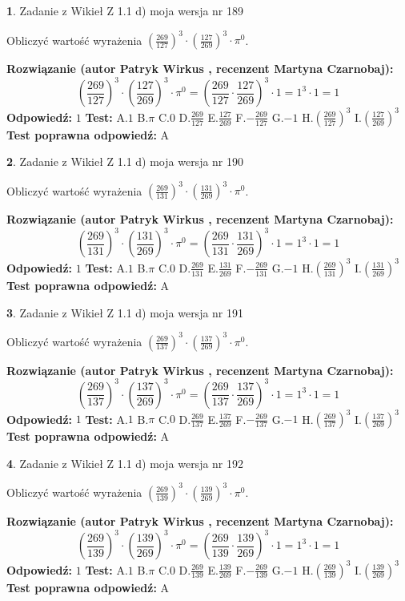 \documentclass[12pt, a4paper]{article}
\theoremstyle{definition} %
\newtheorem{zad}{}
\newcommand{\zadStart}[1]{\begin{zad}#1\newline}
\newcommand{\zadStop}{\end{zad}}
\newcommand{\rozwStart}[2]{\noindent \textbf{Rozwiązanie (autor #1 , recenzent #2): }\newline}
\newcommand{\rozwStop}{\newline}
\newcommand{\odpStart}{\noindent \textbf{Odpowiedź:}\newline}
\newcommand{\odpStop}{\newline}
\newcommand{\testStart}{\noindent \textbf{Test:}\newline}
\newcommand{\testStop}{\newline}
\newcommand{\kluczStart}{\noindent \textbf{Test poprawna odpowiedź:}\newline}
\newcommand{\kluczStop}{\newline}
\begin{document}
\zadStart{Zadanie z Wikieł Z 1.1 d) moja wersja nr 189}

Obliczyć wartość wyrażenia $(\frac{269}{127})^{3} \cdot (\frac{127}{269})^{3} \cdot \pi^{0}$.
\zadStop
\rozwStart{Patryk Wirkus}{Martyna Czarnobaj}
$$(\frac{269}{127})^{3} \cdot (\frac{127}{269})^{3} \cdot \pi^{0} = (\frac{269}{127} \cdot \frac{127}{269})^{3} \cdot 1 = 1^{3} \cdot 1 = 1$$
\rozwStop
\odpStart
$1$
\odpStop
\testStart
A.$1$ B.$\pi$ C.$0$ D.$\frac{269}{127}$ E.$\frac{127}{269}$
F.$-\frac{269}{127}$ G.$-1$
H.$(\frac{269}{127})^{3}$
I.$(\frac{127}{269})^{3}$
\testStop
\kluczStart
A
\kluczStop



\zadStart{Zadanie z Wikieł Z 1.1 d) moja wersja nr 190}

Obliczyć wartość wyrażenia $(\frac{269}{131})^{3} \cdot (\frac{131}{269})^{3} \cdot \pi^{0}$.
\zadStop
\rozwStart{Patryk Wirkus}{Martyna Czarnobaj}
$$(\frac{269}{131})^{3} \cdot (\frac{131}{269})^{3} \cdot \pi^{0} = (\frac{269}{131} \cdot \frac{131}{269})^{3} \cdot 1 = 1^{3} \cdot 1 = 1$$
\rozwStop
\odpStart
$1$
\odpStop
\testStart
A.$1$ B.$\pi$ C.$0$ D.$\frac{269}{131}$ E.$\frac{131}{269}$
F.$-\frac{269}{131}$ G.$-1$
H.$(\frac{269}{131})^{3}$
I.$(\frac{131}{269})^{3}$
\testStop
\kluczStart
A
\kluczStop



\zadStart{Zadanie z Wikieł Z 1.1 d) moja wersja nr 191}

Obliczyć wartość wyrażenia $(\frac{269}{137})^{3} \cdot (\frac{137}{269})^{3} \cdot \pi^{0}$.
\zadStop
\rozwStart{Patryk Wirkus}{Martyna Czarnobaj}
$$(\frac{269}{137})^{3} \cdot (\frac{137}{269})^{3} \cdot \pi^{0} = (\frac{269}{137} \cdot \frac{137}{269})^{3} \cdot 1 = 1^{3} \cdot 1 = 1$$
\rozwStop
\odpStart
$1$
\odpStop
\testStart
A.$1$ B.$\pi$ C.$0$ D.$\frac{269}{137}$ E.$\frac{137}{269}$
F.$-\frac{269}{137}$ G.$-1$
H.$(\frac{269}{137})^{3}$
I.$(\frac{137}{269})^{3}$
\testStop
\kluczStart
A
\kluczStop



\zadStart{Zadanie z Wikieł Z 1.1 d) moja wersja nr 192}

Obliczyć wartość wyrażenia $(\frac{269}{139})^{3} \cdot (\frac{139}{269})^{3} \cdot \pi^{0}$.
\zadStop
\rozwStart{Patryk Wirkus}{Martyna Czarnobaj}
$$(\frac{269}{139})^{3} \cdot (\frac{139}{269})^{3} \cdot \pi^{0} = (\frac{269}{139} \cdot \frac{139}{269})^{3} \cdot 1 = 1^{3} \cdot 1 = 1$$
\rozwStop
\odpStart
$1$
\odpStop
\testStart
A.$1$ B.$\pi$ C.$0$ D.$\frac{269}{139}$ E.$\frac{139}{269}$
F.$-\frac{269}{139}$ G.$-1$
H.$(\frac{269}{139})^{3}$
I.$(\frac{139}{269})^{3}$
\testStop
\kluczStart
A
\kluczStop
\end{document}
